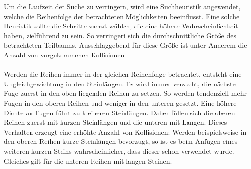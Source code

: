 \documentclass[a4paper, 12pt]{scrartcl}
\begin{document}
Um die Laufzeit der Suche zu verringern, wird eine Suchheuristik angewendet, welche die Reihenfolge der betrachteten Möglichkeiten beeinflusst. Eine solche Heuristik sollte die Schritte zuerst wählen, die eine höhere Wahrscheinlichkeit haben, zielführend zu sein. So verringert sich die durchschnittliche Größe des betrachteten Teilbaums. Ausschlaggebend für diese Größe ist unter Anderem die Anzahl von vorgekommenen Kollisionen.
\\\\
Werden die Reihen immer in der gleichen Reihenfolge betrachtet, entsteht eine Ungleichgewichtung in den Steinlängen. Es wird immer versucht, die nächste Fuge zuerst in den oben liegenden Reihen zu setzen. So werden tendenziell mehr Fugen in den oberen Reihen und weniger in den unteren gesetzt. Eine höhere Dichte an Fugen führt zu kleineren Steinlängen. Daher füllen sich die oberen Reihen zuerst mit kurzen Steinlängen und die unteren mit Langen. Dieses Verhalten erzeugt eine erhöhte Anzahl von Kollisionen: Werden beispielsweise in den oberen Reihen kurze Steinlängen bevorzugt, so ist es beim Anfügen eines weiteren kurzen Steins wahrscheinlicher, dass dieser schon verwendet wurde. Gleiches gilt für die unteren Reihen mit langen Steinen.
\end{document}
